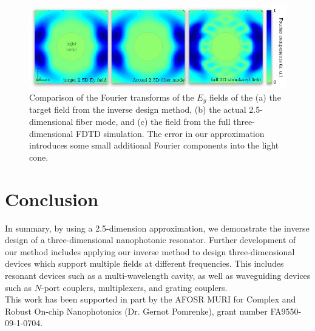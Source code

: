 \begin{figure}[hbt]
\centering\includegraphics[width=\textwidth]{p2/qcomp}
\caption{Comparison of the Fourier transforms of the $E_y$ fields of the (a) the target field from the inverse design method, (b) the actual 2.5-dimensional fiber mode, and (c) the field from the full three-dimensional FDTD simulation. The error in our approximation introduces some small additional Fourier components into the light cone.}\label{qcomp}
\end{figure}

\section{Conclusion}
In summary, by using a 2.5-dimension approximation, we demonstrate the inverse design of a three-dimensional nanophotonic resonator. Further development of our method includes applying our inverse method to design three-dimensional devices which support multiple fields at different frequencies. This includes resonant devices such as a multi-wavelength cavity, as well as waveguiding devices such as $N$-port couplers, multiplexers, and grating couplers.\\

This work has been supported in part by the AFOSR MURI for Complex and Robust On-chip Nanophotonics (Dr. Gernot Pomrenke), grant number FA9550-09-1-0704.
